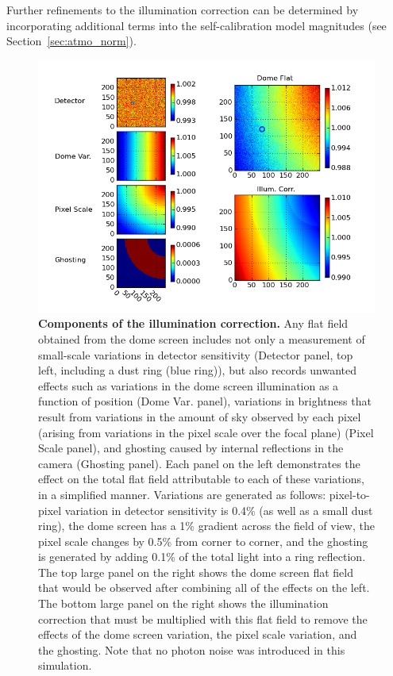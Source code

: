 \documentclass[12pt,preprint]{aastex}
\begin{document}
Further refinements to the illumination correction can be determined
by incorporating additional terms into the self-calibration model
magnitudes (see Section~\ref{sec:atmo_norm}).

\begin{figure}[htbp]
\includegraphics[width=6in]{flatfield_corr}
\caption{ {\small
{\bf Components of the illumination correction.}
Any flat field obtained from the dome screen includes not only a
measurement of small-scale variations in detector sensitivity
(Detector panel, top left, including a dust ring (blue ring)), but
also records unwanted effects such as variations in the dome screen
illumination as a function of position (Dome Var. panel), variations in brightness that
result from variations in the amount of sky observed by each pixel
(arising from variations in the pixel scale over the focal plane)
(Pixel Scale panel), and
ghosting caused by internal reflections in the camera (Ghosting panel).
Each panel on the left demonstrates the effect on the total flat field
attributable to each of these variations, in a simplified manner. 
Variations are generated as follows: pixel-to-pixel variation in
detector sensitivity is 0.4\% (as well as a small dust ring), the dome
screen has a 1\% gradient across the field of view, the pixel scale
changes by 0.5\% from corner to corner, and the ghosting is generated
by adding 0.1\% of the total light into a ring reflection. 
The top large panel on the right shows the dome screen flat field that
would be observed after combining all of the effects on the left. The bottom large panel on
the right shows the illumination correction that must be multiplied with 
this flat field to remove the effects of the dome screen variation,
the pixel scale variation, and the ghosting.   Note that no photon noise was
introduced in this simulation. }}  \label{fig:flatfield}
\end{figure}
\end{document}
